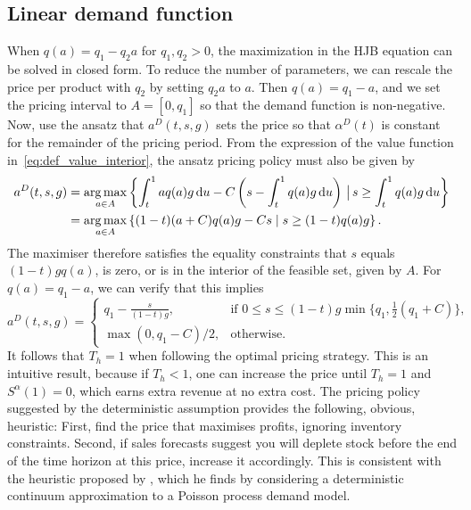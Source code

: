 \documentclass[main.tex]{subfiles}
\begin{document}
\subsection{Linear demand function}
When $q(a)=q_1-q_2a$ for $q_1,q_2>0$, the maximization in the HJB
equation can be solved in closed form.
To reduce the number of parameters, we can rescale the price per
product with $q_2$ by setting $q_2a$ to $a$.
Then $q(a)=q_1-a$, and we set the pricing interval to $A=[0,q_1]$ so that the demand
function is non-negative.
Now, use the ansatz that $a^D(t,s,g)$ sets the price so that
$\alpha^D(t)$ is
constant for the remainder of the pricing period.
From the expression of the value function
in~\eqref{eq:def_value_interior}, the ansatz pricing policy must
also be given by
\begin{align}
  a^D(t,s,g)
  &=\operatorname*{arg\,max}_{a\in A}\left\{\int_t^1aq(a)g\,\mathrm{d}u -
    C\left(s-\int_t^1q(a)g\,\mathrm{d}u\right) \,\big|\,  s \geq \int_t^1q(a)g\,\mathrm{d}u\right\}\\
  &=\operatorname*{arg\,max}_{a\in A}\left\{(1-t)(a+C)q(a)g-Cs \mid  s \geq
    (1-t)q(a)g\right\}.
\end{align}
The maximiser therefore satisfies the equality constraints that
$s$ equals $(1-t)gq(a)$, is zero, or is in the interior of the feasible set,
given by $A$.
For $q(a)=q_1-a$, we can verify that this implies
\begin{equation}\label{eq:astar_linear}
  a^D(t,s,g)=\begin{cases}
    q_1-\frac{s}{(1-t)g}, &\text{if } 0\leq s\leq
    (1-t)g\min\{q_1,\frac{1}{2}(q_1 +C)\},\\
    \max(0,q_1-C)/2,&\text{otherwise.}
  \end{cases}
\end{equation}
It follows that $T_h=1$ when following the optimal pricing strategy.
This is an intuitive result, because if $T_h<1$, one can increase the
price until $T_h=1$ and $S^\alpha(1)=0$, which earns extra revenue at no extra cost.
The pricing policy suggested by the
deterministic assumption provides the following, obvious, heuristic:
First, find the price that maximises profits, ignoring inventory
constraints. Second, if sales forecasts suggest you will deplete stock
before the end of the time horizon at this price, increase it
accordingly. This is consistent with the heuristic proposed
by \citet{schlosser2015dynamic1,schlosser2015dynamic2}, which
he finds by considering a deterministic continuum
approximation to a Poisson process demand model.
\end{document}
